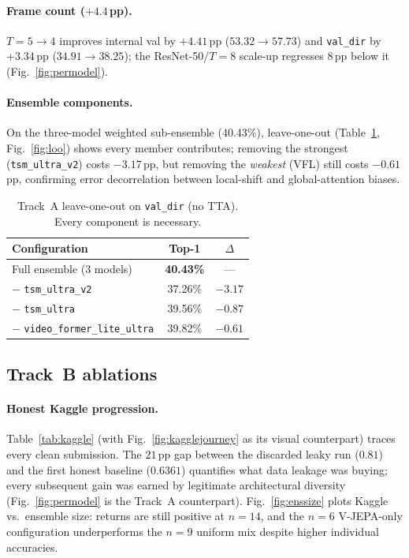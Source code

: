 \documentclass[10pt,twocolumn,letterpaper]{article}
\begin{document}
\paragraph{Frame count ($+4.4$\,pp).}
$T{=}5\!\rightarrow\!4$ improves internal val by $+4.41$\,pp
($53.32\!\rightarrow\!57.73$) and \texttt{val\_dir} by $+3.34$\,pp
($34.91\!\rightarrow\!38.25$); the ResNet-50/$T{=}8$ scale-up regresses
$8$\,pp below it (Fig.~\ref{fig:permodel}).

\paragraph{Ensemble components.}
On the three-model weighted sub-ensemble (40.43\%), leave-one-out
(Table~\ref{tab:loo}, Fig.~\ref{fig:loo}) shows every member contributes;
removing the strongest (\texttt{tsm\_ultra\_v2}) costs $-3.17$\,pp, but removing
the \emph{weakest} (VFL) still costs $-0.61$\,pp, confirming error decorrelation
between local-shift and global-attention biases.

\begin{table}[t]
\centering\small
\begin{tabular}{@{}lcc@{}}
\toprule
Configuration & Top-1 & $\Delta$ \\
\midrule
Full ensemble (3 models)        & \textbf{40.43\%} & --- \\
\;$-$ \texttt{tsm\_ultra\_v2}   & 37.26\% & $-3.17$ \\
\;$-$ \texttt{tsm\_ultra}       & 39.56\% & $-0.87$ \\
\;$-$ \texttt{video\_former\_lite\_ultra} & 39.82\% & $-0.61$ \\
\bottomrule
\end{tabular}
\caption{Track~A leave-one-out on \texttt{val\_dir} (no TTA). Every component is
necessary.}
\label{tab:loo}
\end{table}

\subsection{Track~B ablations}
\paragraph{Honest Kaggle progression.}
Table~\ref{tab:kaggle} (with Fig.~\ref{fig:kagglejourney} as its visual
counterpart) traces every clean submission. The $21$\,pp gap between
the discarded leaky run ($0.81$) and the first honest baseline ($0.6361$)
quantifies what data leakage was buying; every subsequent gain was earned by
legitimate architectural diversity (Fig.~\ref{fig:permodel} is the Track~A
counterpart). Fig.~\ref{fig:enssize} plots Kaggle vs.\ ensemble size: returns
are still positive at $n{=}14$, and the $n{=}6$ V-JEPA-only configuration
underperforms the $n{=}9$ uniform mix despite higher individual accuracies.
\end{document}
